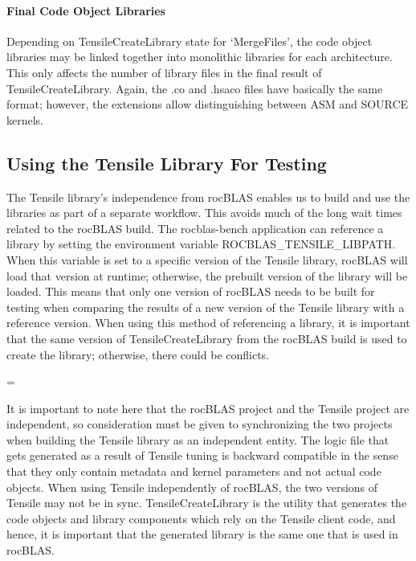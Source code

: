 \documentclass[]{article}
\newenvironment{warning}
{\par\begin{mdframed}[linewidth=2pt,linecolor=red]
		\begin{list}{}{\leftmargin=1cm
				\labelwidth=\leftmargin}\item[\Large\ding{43}]}
		{\end{list}\end{mdframed}\par}
\begin{document}
\paragraph{Final Code Object Libraries}

Depending on TensileCreateLibrary state for `MergeFiles', the code object libraries may be linked together into monolithic libraries for each architecture. This only affects the number of library files in the final result of TensileCreateLibrary. Again, the .co and .hsaco files have basically the same format; however, the extensions allow distinguishing between ASM and SOURCE kernels.

\subsection{Using the Tensile Library For Testing}
\label{sec:TensileCreateLib}

The Tensile library's independence from rocBLAS enables us to build and use the libraries as part of a separate workflow. This avoids much of the long wait times related to the rocBLAS build. The rocblas-bench application can reference a library by setting the environment variable ROCBLAS\_TENSILE\_LIBPATH. When this variable is set to a specific version of the Tensile library, rocBLAS will load that version at runtime; otherwise, the prebuilt version of the library will be loaded. This means that only one version of rocBLAS needs to be built for testing when comparing the results of a new version of the Tensile library with a reference version. When using this method of referencing a library, it is important that the same version of TensileCreateLibrary from the rocBLAS build is used to create the library; otherwise, there could be conflicts.

\begin{warning}
	It is important to note here that the rocBLAS project and the Tensile project are independent, so consideration must be given to synchronizing the two projects when building the Tensile library as an independent entity. The logic file that gets generated as a result of Tensile tuning is backward compatible in the sense that they only contain metadata and kernel parameters and not actual code objects. When using Tensile independently of rocBLAS, the two versions of Tensile may not be in sync. TensileCreateLibrary is the utility that generates the code objects and library components which rely on the Tensile client code, and hence, it is important that the generated library is the same one that is used in rocBLAS.
\end{warning}
\end{document}

